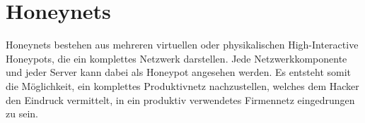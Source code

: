 \chapter{Honeynets}
Honeynets bestehen aus mehreren virtuellen oder physikalischen High-Interactive Honeypots, die ein komplettes Netzwerk darstellen\cite{grimes.2003a}\cite{spitzner.2002a}. Jede Netzwerkkomponente und jeder Server kann dabei als Honeypot angesehen werden. Es entsteht somit die Möglichkeit, ein komplettes Produktivnetz nachzustellen, welches dem Hacker den Eindruck vermittelt, in ein produktiv verwendetes Firmennetz eingedrungen zu sein\cite{grimes.2003a}.





